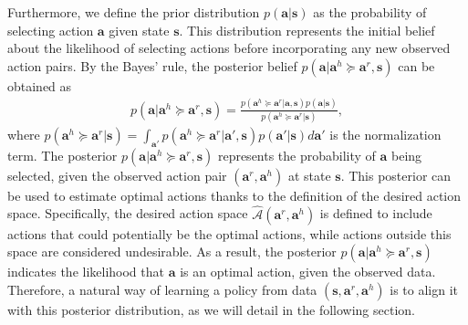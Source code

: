 Furthermore, we define the prior distribution $p(\bm a | \bm s)$ as the probability of selecting action  $\bm a$ given state $\bm s$.
This distribution represents the initial belief about the likelihood of selecting actions before incorporating any new observed action pairs. 
By the Bayes' rule, the posterior belief $ p (  \bm a |\bm a^h \succeq \bm a^r,  \bm s)$ can be obtained as 
\begin{align}
p ( \bm a |  \bm a^h \succeq \bm a^r,  \bm s) =\frac{ p (\bm a^h \succeq \bm a^r | \bm a ,\bm s) p(\bm a | \bm s)}{p (\bm a^h \succeq \bm a^r | \bm s)}, 
    \label{eq:posterior_data}
\end{align}
where $ p (\bm a^h \succeq \bm a^r | \bm s) = \int_{\bm a'} p (\bm a^h \succeq \bm a^r | \bm a', \bm s) p(\bm a'  | \bm s) d \bm a'$ is the normalization term.
  The posterior $p ( \bm a |  \bm a^h \succeq \bm a^r,  \bm s)$ represents the probability of $\bm a$ being selected, given the observed action pair $(\bm a^r, \bm a^h)$  at state $\bm s$.
  This posterior can be used to estimate optimal actions thanks to the definition of the desired action space. 
  Specifically, the desired action space $\hat{\mathcal{A}}{(\bm a^r, \bm a^h)}$ is defined to include actions that could potentially be the optimal actions, while actions outside this space are considered undesirable. As a result, the posterior $p(\bm a | \bm a^h \succeq \bm a^r, \bm s)$ indicates the likelihood that $\bm a$ is an optimal action, given the observed data.
Therefore, a natural way of learning a policy from data $(\bm s, \bm a^r, \bm a^h)$ is to align it with this posterior distribution, as we will detail in the following section. 









